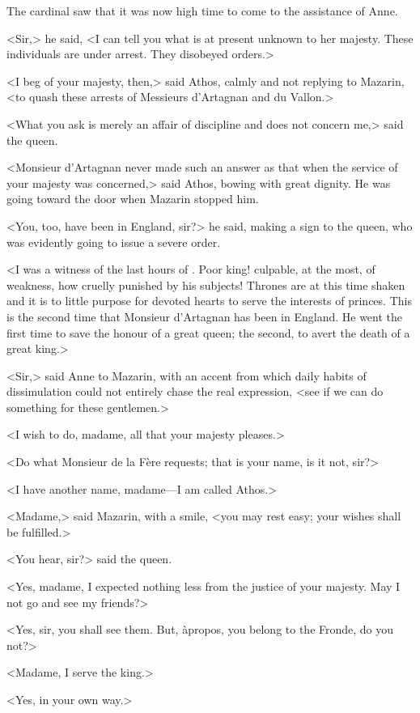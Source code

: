 The cardinal saw that it was now high time to come to the assistance of Anne.

<Sir,> he said, <I can tell you what is at present unknown to her majesty. These individuals are under arrest. They disobeyed orders.>

<I beg of your majesty, then,> said Athos, calmly and not replying to Mazarin, <to quash these arrests of Messieurs d'Artagnan and du Vallon.>

<What you ask is merely an affair of discipline and does not concern me,> said the queen.

<Monsieur d'Artagnan never made such an answer as that when the service of your majesty was concerned,> said Athos, bowing with great dignity. He was going toward the door when Mazarin stopped him.

<You, too, have been in England, sir?> he said, making a sign to the queen, who was evidently going to issue a severe order.

<I was a witness of the last hours of .  Poor king! culpable, at the most, of weakness, how cruelly punished by his subjects! Thrones are at this time shaken and it is to little purpose for devoted hearts to serve the interests of princes. This is the second time that Monsieur d'Artagnan has been in England. He went the first time to save the honour of a great queen; the second, to avert the death of a great king.>

<Sir,> said Anne to Mazarin, with an accent from which daily habits of dissimulation could not entirely chase the real expression, <see if we can do something for these gentlemen.>

<I wish to do, madame, all that your majesty pleases.>

<Do what Monsieur de la Fère requests; that is your name, is it not, sir?>

<I have another name, madame—I am called Athos.>

<Madame,> said Mazarin, with a smile, <you may rest easy; your wishes shall be fulfilled.>

<You hear, sir?> said the queen.

<Yes, madame, I expected nothing less from the justice of your majesty. May I not go and see my friends?>

<Yes, sir, you shall see them. But, àpropos, you belong to the Fronde, do you not?>

<Madame, I serve the king.>

<Yes, in your own way.>

